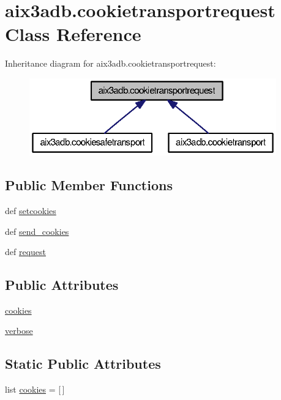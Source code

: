 \section{aix3adb.\-cookietransportrequest Class Reference}
\label{classaix3adb_1_1cookietransportrequest}


Inheritance diagram for aix3adb.\-cookietransportrequest\-:
\nopagebreak
\begin{figure}[H]
\begin{center}
\leavevmode
\includegraphics[width=302pt]{classaix3adb_1_1cookietransportrequest__inherit__graph}
\end{center}
\end{figure}
\subsection*{Public Member Functions}
\begin{DoxyCompactItemize}
\item 
def \hyperlink{classaix3adb_1_1cookietransportrequest_abe6fadeb9e155d3c411054a107b09a80}{setcookies}
\item 
def \hyperlink{classaix3adb_1_1cookietransportrequest_aea3312026b80bf1f9245bac8c99e13d7}{send\-\_\-cookies}
\item 
def \hyperlink{classaix3adb_1_1cookietransportrequest_ad6b074fd05e772950428b808e9fd789e}{request}
\end{DoxyCompactItemize}
\subsection*{Public Attributes}
\begin{DoxyCompactItemize}
\item 
\hyperlink{classaix3adb_1_1cookietransportrequest_a580ba93ad6177a431eff2307bb2d93bd}{cookies}
\item 
\hyperlink{classaix3adb_1_1cookietransportrequest_aa84359ac88f7315c9fabb150f71e5e1b}{verbose}
\end{DoxyCompactItemize}
\subsection*{Static Public Attributes}
\begin{DoxyCompactItemize}
\item 
list \hyperlink{classaix3adb_1_1cookietransportrequest_a8ef9827d4856636aa211c8db0eaf7201}{cookies} = \mbox{[}$\,$\mbox{]}
\end{DoxyCompactItemize}


